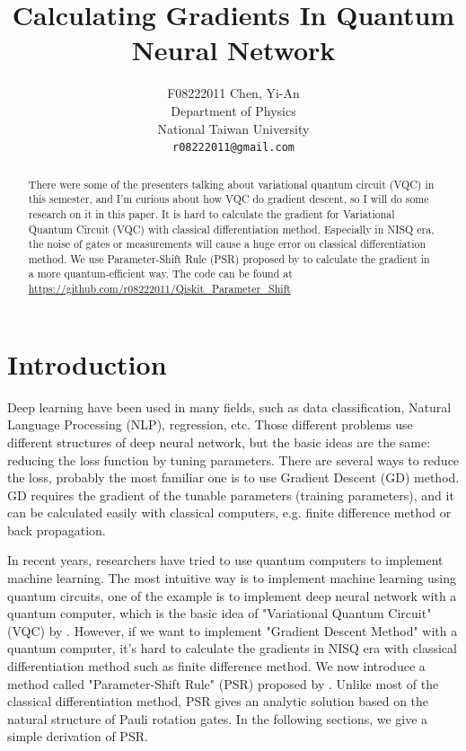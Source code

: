 \documentclass{article}
\title{Calculating Gradients In Quantum Neural Network}
\author{F08222011 Chen, Yi-An\\
	Department of Physics\\
	National Taiwan University\\
	\texttt{r08222011@gmail.com} \\
}
\date{}
\begin{document}
\maketitle

\begin{abstract}
    
    There were some of the presenters talking about variational quantum circuit (VQC) in this semester, and I'm curious about how VQC do gradient descent, so I will do some research on it in this paper. It is hard to calculate the gradient for Variational Quantum Circuit (VQC) with classical differentiation method. Especially in NISQ era, the noise of gates or measurements will cause a huge error on classical differentiation method. We use Parameter-Shift Rule (PSR) proposed by \citet{1905.13311} to calculate the gradient in a more quantum-efficient way. The code can be found at \url{https://github.com/r08222011/Qiskit\_Parameter\_Shift}
    
\end{abstract}




\section{Introduction}
Deep learning have been used in many fields, such as data classification, Natural Language Processing (NLP), regression, etc. Those different problems use different structures of deep neural network, but the basic ideas are the same: reducing the loss function by tuning parameters. There are several ways to reduce the loss, probably the most familiar one is to use Gradient Descent (GD) method. GD requires the gradient of the tunable parameters (training parameters), and it can be calculated easily with classical computers, e.g. finite difference method or back propagation.

In recent years, researchers have tried to use quantum computers to implement machine learning. The most intuitive way is to implement machine learning using quantum circuits, one of the example is to implement deep neural network with a quantum computer, which is the basic idea of "Variational Quantum Circuit" (VQC) by \citet{VQE}. However, if we want to implement "Gradient Descent Method" with a quantum computer, it's hard to calculate the gradients in NISQ era with classical differentiation method such as finite difference method. We now introduce a method called "Parameter-Shift Rule" (PSR) proposed by \citet{1905.13311}. Unlike most of the classical differentiation method, PSR gives an analytic solution based on the natural structure of Pauli rotation gates. In the following sections, we give a simple derivation of PSR.
\end{document}
